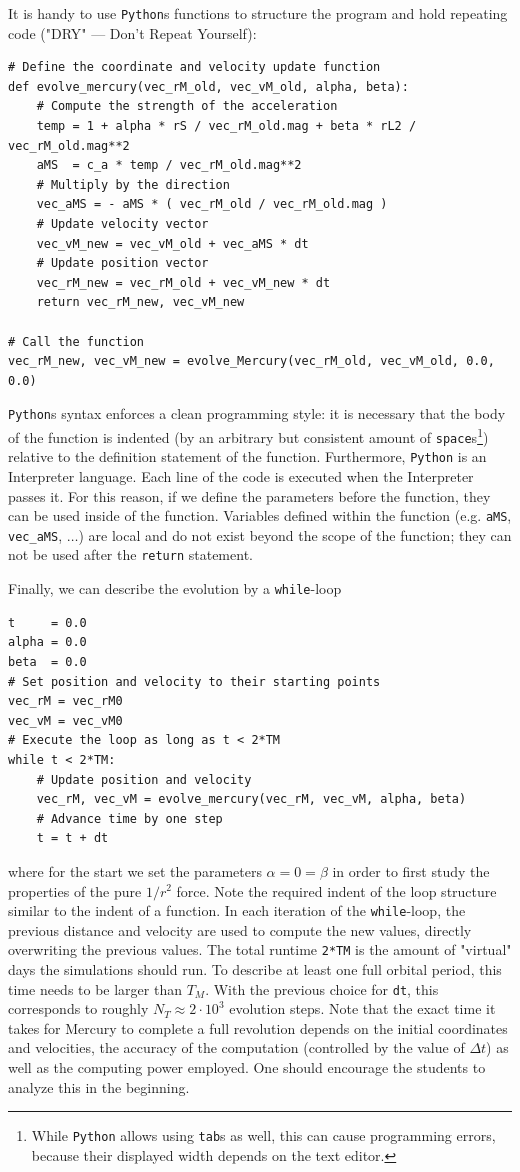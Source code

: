 \documentclass[12pt,ngerman,american]{iopart}
\newcommand{\python}[0]{\texttt{Python}}
\newcommand{\code}[1]{{\scriptsize\colorbox{light-gray}{\texttt{#1}}}}
\begin{document}
It is handy to use \texttt{Python}s functions to structure the program and hold repeating code ("DRY" --- Don't Repeat Yourself):
\begin{lstlisting}
# Define the coordinate and velocity update function
def evolve_mercury(vec_rM_old, vec_vM_old, alpha, beta):
    # Compute the strength of the acceleration
    temp = 1 + alpha * rS / vec_rM_old.mag + beta * rL2 / vec_rM_old.mag**2
    aMS  = c_a * temp / vec_rM_old.mag**2
    # Multiply by the direction
    vec_aMS = - aMS * ( vec_rM_old / vec_rM_old.mag )
    # Update velocity vector
    vec_vM_new = vec_vM_old + vec_aMS * dt
    # Update position vector
    vec_rM_new = vec_rM_old + vec_vM_new * dt
    return vec_rM_new, vec_vM_new

# Call the function
vec_rM_new, vec_vM_new = evolve_Mercury(vec_rM_old, vec_vM_old, 0.0, 0.0)
\end{lstlisting}
\python{}s syntax enforces a clean programming style: it is necessary that the body of the function is indented (by an arbitrary but consistent amount of \texttt{space}s\footnote{While \python{} allows using \texttt{tab}s as well, this can cause programming errors, because their displayed width depends on the text editor.}) relative to the definition statement of the function.
Furthermore, \python{} is an Interpreter language.
Each line of the code is executed when the Interpreter passes it.
For this reason, if we define the parameters before the function, they can be used inside of the function.
Variables defined within the function (e.g. \code{aMS}, \code{vec\_aMS}, $\dots$) are local and do not exist beyond the scope of the function; they can not be used after the \texttt{return} statement.

Finally, we can describe the evolution by a \texttt{while}-loop
\begin{lstlisting}
t     = 0.0
alpha = 0.0
beta  = 0.0
# Set position and velocity to their starting points
vec_rM = vec_rM0
vec_vM = vec_vM0
# Execute the loop as long as t < 2*TM
while t < 2*TM:
    # Update position and velocity
    vec_rM, vec_vM = evolve_mercury(vec_rM, vec_vM, alpha, beta)
    # Advance time by one step
    t = t + dt
\end{lstlisting}
where for the start we set the parameters $\alpha=0 = \beta$ in order to first study the properties of the pure
$1/r^2$ force.
Note the required indent of the loop structure similar to the indent of a function.
In each iteration of the \texttt{while}-loop, the previous distance and velocity are used to compute the new values,
directly overwriting the previous values.
The total runtime \texttt{2*TM} is the amount of "virtual" days the simulations should run.
To describe at least one full orbital period, this time needs to be larger than $T_M$.
With the previous choice for \texttt{dt}, this corresponds to roughly $N_T \approx 2 \cdot 10^3$ evolution steps.
Note that the exact time it takes for Mercury to complete a full revolution depends on the initial coordinates and velocities, the accuracy of the computation
(controlled by the value of $\Delta t$) as well as the computing power employed.
One should encourage the students to analyze this in the beginning.
\end{document}

